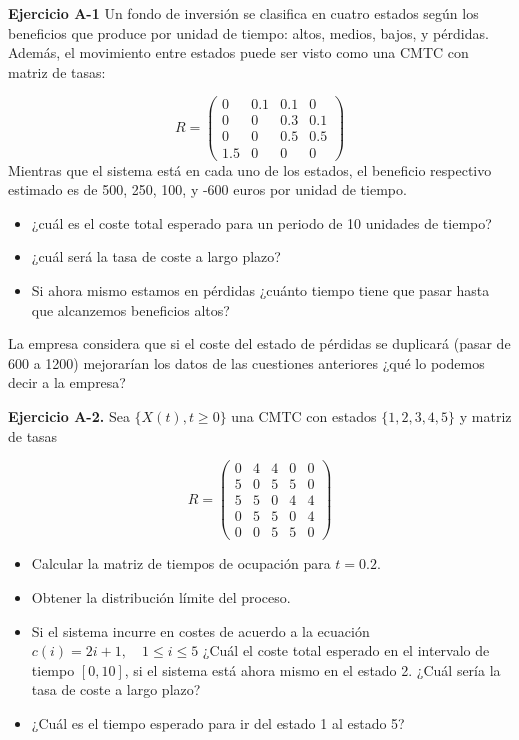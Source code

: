\documentclass[
]{book}
\providecommand{\tightlist}{%
  \setlength{\itemsep}{0pt}\setlength{\parskip}{0pt}}
\theoremstyle{definition}
\theoremstyle{definition}
\theoremstyle{definition}
\theoremstyle{definition}
\theoremstyle{remark}
\begin{document}
\textbf{Ejercicio A-1} Un fondo de inversión se clasifica en cuatro estados según los beneficios que produce por unidad de tiempo: altos, medios, bajos, y pérdidas. Además, el movimiento entre estados puede ser visto como una CMTC con matriz de tasas:

\[
R = \begin{pmatrix}
0 & 0.1 & 0.1 & 0\\
0 & 0 & 0.3 & 0.1\\
0 & 0 & 0.5 & 0.5\\
1.5 & 0 & 0  & 0 
\end{pmatrix}
\]
Mientras que el sistema está en cada uno de los estados, el beneficio respectivo estimado es de 500, 250, 100, y -600 euros por unidad de tiempo.

\begin{itemize}
\tightlist
\item
  ¿cuál es el coste total esperado para un periodo de 10 unidades de tiempo?
\item
  ¿cuál será la tasa de coste a largo plazo?
\item
  Si ahora mismo estamos en pérdidas ¿cuánto tiempo tiene que pasar hasta que alcanzemos beneficios altos?
\end{itemize}

La empresa considera que si el coste del estado de pérdidas se duplicará (pasar de 600 a 1200) mejorarían los datos de las cuestiones anteriores ¿qué lo podemos decir a la empresa?

\textbf{Ejercicio A-2.} Sea \(\{X(t), t \geq 0\}\) una CMTC con estados \(\{1, 2, 3, 4, 5\}\) y matriz de tasas

\[
R = \begin{pmatrix}
0 & 4 & 4 & 0 & 0\\
5 & 0 & 5 & 5 & 0\\
5 & 5 & 0 & 4 & 4\\
0 & 5 & 5  & 0 & 4\\
0 & 0& 5& 5& 0
\end{pmatrix}
\]

\begin{itemize}
\tightlist
\item
  Calcular la matriz de tiempos de ocupación para \(t=0.2\).
\item
  Obtener la distribución límite del proceso.
\item
  Si el sistema incurre en costes de acuerdo a la ecuación \(c(i) = 2i+1, \quad 1\leq i\leq 5\) ¿Cuál el coste total esperado en el intervalo de tiempo \([0, 10]\), si el sistema está ahora mismo en el estado 2. ¿Cuál sería la tasa de coste a largo plazo?
\item
  ¿Cuál es el tiempo esperado para ir del estado 1 al estado 5?
\end{itemize}
\end{document}

